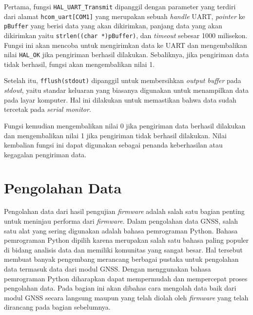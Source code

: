 Pertama, fungsi \texttt{HAL\_UART\_Transmit} dipanggil dengan parameter yang terdiri dari alamat \texttt{hcom\_uart[COM1]} yang merupakan sebuah \textit{handle} UART, \textit{pointer} ke \texttt{pBuffer} yang berisi data yang akan dikirimkan, panjang data yang akan dikirimkan yaitu \texttt{strlen((char *)pBuffer)}, dan \textit{timeout} sebesar 1000 milisekon. Fungsi ini akan mencoba untuk mengirimkan data ke UART dan mengembalikan nilai \texttt{HAL\_OK} jika pengiriman berhasil dilakukan. Sebaliknya, jika pengiriman data tidak berhasil, fungsi akan mengembalikan nilai 1.

Setelah itu, \texttt{fflush(stdout)} dipanggil untuk membersihkan \textit{output buffer} pada \textit{stdout}, yaitu standar keluaran yang biasanya digunakan untuk menampilkan data pada layar komputer. Hal ini dilakukan untuk memastikan bahwa data sudah tercetak pada \textit{serial monitor}.

Fungsi kemudian mengembalikan nilai 0 jika pengiriman data berhasil dilakukan dan mengembalikan nilai 1 jika pengiriman tidak berhasil dilakukan. Nilai kembalian fungsi ini dapat digunakan sebagai penanda keberhasilan atau kegagalan pengiriman data.

\section{Pengolahan Data}
Pengolahan data dari hasil pengujian \textit{firmware} adalah salah satu bagian penting untuk meninjau performa dari \textit{firmware}. Dalam pengolahan data GNSS, salah satu alat yang sering digunakan adalah bahasa pemrograman Python. Bahasa pemrograman Python dipilih karena merupakan salah satu bahasa paling populer di bidang analisis data dan memiliki komunitas yang sangat besar. Hal tersebut membuat banyak pengembang merancang berbagai pustaka untuk pengolahan data termasuk data dari modul GNSS. Dengan menggunakan bahasa pemrograman Python diharapkan dapat mempermudah dan mempercepat proses pengolahan data. Pada bagian ini akan dibahas cara mengolah data baik dari modul GNSS secara langsung maupun yang telah diolah oleh \textit{firmware} yang telah dirancang pada bagian sebelumnya.

